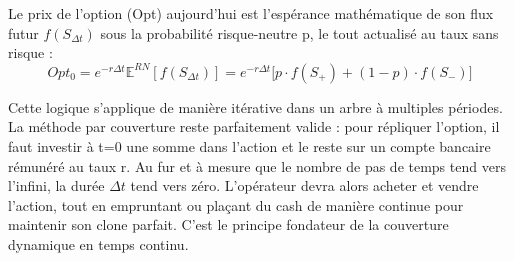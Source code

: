\begin{definitionbox}
Le prix de l'option (Opt) aujourd'hui est l'espérance mathématique de son flux futur $f(S_{\Delta t})$ sous la probabilité risque-neutre p, le tout actualisé au taux sans risque :
\begin{equation}
    \label{eq:fsec3-prix_actualise}
    Opt_0 = e^{-r\Delta t} \mathbb{E}^{RN}[f(S_{\Delta t})] = e^{-r\Delta t} \Big[ p \cdot f(S_+) + (1-p) \cdot f(S_-) \Big]
\end{equation}
\end{definitionbox}

Cette logique s'applique de manière itérative dans un arbre à multiples périodes. La méthode par couverture reste parfaitement valide : pour répliquer l'option, il faut investir à t=0 une somme dans l'action et le reste sur un compte bancaire rémunéré au taux r. 
Au fur et à mesure que le nombre de pas de temps tend vers l'infini, la durée $\Delta t$ tend vers zéro. L'opérateur devra alors acheter et vendre l'action, tout en empruntant ou plaçant du cash de manière continue pour maintenir son clone parfait. C'est le principe fondateur de la couverture dynamique en temps continu.


